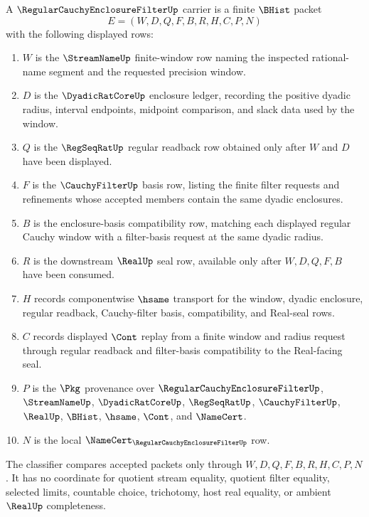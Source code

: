 \begin{definition}
\label{def:regular-cauchy-enclosure-filter-carrier}
A $\RegularCauchyEnclosureFilterUp$ carrier is a finite $\BHist$ packet
$$
E=(W,D,Q,F,B,R,H,C,P,N)
$$
with the following displayed rows:
\begin{enumerate}
\item $W$ is the $\StreamNameUp$ finite-window row naming the inspected rational-name segment and the requested precision window.
\item $D$ is the $\DyadicRatCoreUp$ enclosure ledger, recording the positive dyadic radius, interval endpoints, midpoint comparison, and slack data used by the window.
\item $Q$ is the $\RegSeqRatUp$ regular readback row obtained only after $W$ and $D$ have been displayed.
\item $F$ is the $\CauchyFilterUp$ basis row, listing the finite filter requests and refinements whose accepted members contain the same dyadic enclosures.
\item $B$ is the enclosure-basis compatibility row, matching each displayed regular Cauchy window with a filter-basis request at the same dyadic radius.
\item $R$ is the downstream $\RealUp$ seal row, available only after $W,D,Q,F,B$ have been consumed.
\item $H$ records componentwise $\hsame$ transport for the window, dyadic enclosure, regular readback, Cauchy-filter basis, compatibility, and Real-seal rows.
\item $C$ records displayed $\Cont$ replay from a finite window and radius request through regular readback and filter-basis compatibility to the Real-facing seal.
\item $P$ is the $\Pkg$ provenance over $\RegularCauchyEnclosureFilterUp$, $\StreamNameUp$, $\DyadicRatCoreUp$, $\RegSeqRatUp$, $\CauchyFilterUp$, $\RealUp$, $\BHist$, $\hsame$, $\Cont$, and $\NameCert$.
\item $N$ is the local $\NameCert_{\RegularCauchyEnclosureFilterUp}$ row.
\end{enumerate}
The classifier compares accepted packets only through $W,D,Q,F,B,R,H,C,P,N$. It has no coordinate for quotient stream equality, quotient filter equality, selected limits, countable choice, trichotomy, host real equality, or ambient $\RealUp$ completeness.
\end{definition}

